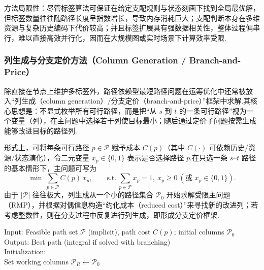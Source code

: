 方法局限性：尽管标签算法可保证在给定支配规则与状态刻画下找到全局最优解，但标签数量往往随路径长度呈指数增长，导致内存消耗巨大；支配判断本身在多维资源与复杂历史编码下代价较高；并且标签扩展具有强数据相关性，整体过程偏串行，难以直接高效并行化，因而在大规模图或实时场景下计算效率受限.

\subsubsection{列生成与分支定价方法（Column Generation / Branch-and-Price）}

除直接在节点上维护多标签外，路径依赖型最短路径问题在运筹优化中还常被放入“列生成（column generation）/分支定价（branch-and-price）”框架中求解.其核心思想是：不显式枚举所有可行路径，而是把“从 $s$ 到 $t$ 的一条可行路径”视为一个变量（列），在主问题中选择若干列使目标最小；随后通过定价子问题按需生成能够改进目标的路径列.

形式上，可将每条可行路径 $p\in\mathcal{P}$ 赋予成本 $C(p)$（其中 $C(\cdot)$ 可依赖历史/资源/状态演化），令二元变量 $x_p\in\{0,1\}$ 表示是否选择路径 $p$.在只选一条 $s$--$t$ 路径的基本情形下，主问题可写为
\[
  \min\ \sum_{p\in\mathcal{P}} C(p)\,x_p,\qquad
  \text{s.t.}\ \sum_{p\in\mathcal{P}} x_p = 1,\ x_p\ge 0\ (\text{或 }x_p\in\{0,1\}).
\]
由于 $|\mathcal{P}|$ 往往极大，列生成从一个小的路径集合 $\mathcal{P}_0$ 开始求解受限主问题（RMP），并根据对偶信息构造“约化成本（reduced cost）”来寻找新的改进列；若考虑整数性，则在分支过程中反复进行列生成，即形成分支定价框架.

\begin{algorithm}[H]
  \SetAlgoLined
  \caption{Column Generation Framework for Path-Dependent Shortest Path}
  \label{algo:pdsp_column_generation}

  Input: Feasible path set $\mathcal{P}$ (implicit), path cost $C(p)$; initial columns $\mathcal{P}_0$\\
  Output: Best path (integral if solved with branching)\\

  Initialization:\\
  Set working columns $\mathcal{P}_R \leftarrow \mathcal{P}_0$\\



  \\
\end{algorithm}

